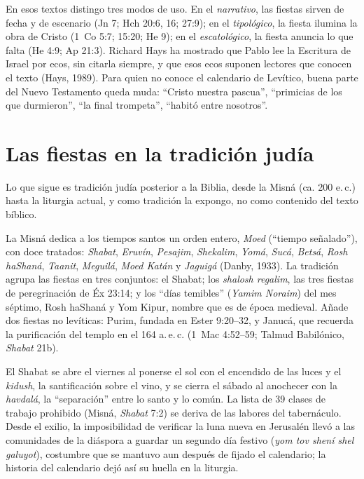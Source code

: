 \documentclass[11pt,letterpaper]{article}
\begin{document}
En esos textos distingo tres modos de uso. En el \emph{narrativo}, las fiestas sirven de fecha y de escenario (Jn 7; Hch 20:6, 16; 27:9); en el \emph{tipológico}, la fiesta ilumina la obra de Cristo (1~Co 5:7; 15:20; He 9); en el \emph{escatológico}, la fiesta anuncia lo que falta (He 4:9; Ap 21:3). Richard Hays ha mostrado que Pablo lee la Escritura de Israel por ecos, sin citarla siempre, y que esos ecos suponen lectores que conocen el texto (Hays, 1989). Para quien no conoce el calendario de Levítico, buena parte del Nuevo Testamento queda muda: ``Cristo nuestra pascua'', ``primicias de los que durmieron'', ``la final trompeta'', ``habitó entre nosotros''.

\section{Las fiestas en la tradición judía}\label{sec:tradicion}

\begin{nota}[Precisión]
Lo que sigue es tradición judía posterior a la Biblia, desde la Misná (ca. 200 e.\,c.) hasta la liturgia actual, y como tradición la expongo, no como contenido del texto bíblico.
\end{nota}

La Misná dedica a los tiempos santos un orden entero, \emph{Moed} (``tiempo señalado''), con doce tratados: \emph{Shabat}, \emph{Eruvín}, \emph{Pesajim}, \emph{Shekalim}, \emph{Yomá}, \emph{Sucá}, \emph{Betsá}, \emph{Rosh haShaná}, \emph{Taanit}, \emph{Meguilá}, \emph{Moed Katán} y \emph{Jaguigá} (Danby, 1933). La tradición agrupa las fiestas en tres conjuntos: el Shabat; los \emph{shalosh regalim}, las tres fiestas de peregrinación de Éx 23:14; y los ``días temibles'' (\emph{Yamim Noraim}) del mes séptimo, Rosh haShaná y Yom Kipur, nombre que es de época medieval. Añade dos fiestas no levíticas: Purim, fundada en Ester 9:20--32, y Janucá, que recuerda la purificación del templo en el 164 a.\,e.\,c. (1~Mac 4:52--59; Talmud Babilónico, \emph{Shabat} 21b).

El Shabat se abre el viernes al ponerse el sol con el encendido de las luces y el \emph{kidush}, la santificación sobre el vino, y se cierra el sábado al anochecer con la \emph{havdalá}, la ``separación'' entre lo santo y lo común. La lista de 39 clases de trabajo prohibido (Misná, \emph{Shabat} 7:2) se deriva de las labores del tabernáculo. Desde el exilio, la imposibilidad de verificar la luna nueva en Jerusalén llevó a las comunidades de la diáspora a guardar un segundo día festivo (\emph{yom tov shení shel galuyot}), costumbre que se mantuvo aun después de fijado el calendario; la historia del calendario dejó así su huella en la liturgia.
\end{document}
